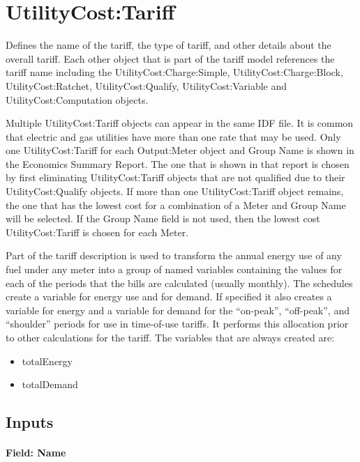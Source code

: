 \section{UtilityCost:Tariff}\label{utilitycosttariff}

Defines the name of the tariff, the type of tariff, and other details about the overall tariff. Each other object that is part of the tariff model references the tariff name including the UtilityCost:Charge:Simple, UtilityCost:Charge:Block, UtilityCost:Ratchet, UtilityCost:Qualify, UtilityCost:Variable and UtilityCost:Computation objects.

Multiple UtilityCost:Tariff objects can appear in the same IDF file. It is common that electric and gas utilities have more than one rate that may be used. Only one UtilityCost:Tariff for each Output:Meter object and Group Name is shown in the Economics Summary Report. The one that is shown in that report is chosen by first eliminating UtilityCost:Tariff objects that are not qualified due to their UtilityCost:Qualify objects. If more than one UtilityCost:Tariff object remains, the one that has the lowest cost for a combination of a Meter and Group Name will be selected. If the Group Name field is not used, then the lowest cost UtilityCost:Tariff is chosen for each Meter.

Part of the tariff description is used to transform the annual energy use of any fuel under any meter into a group of named variables containing the values for each of the periods that the bills are calculated (usually monthly). The schedules create a variable for energy use and for demand. If specified it also creates a variable for energy and a variable for demand for the ``on-peak'', ``off-peak'', and ``shoulder'' periods for use in time-of-use tariffs. It performs this allocation prior to other calculations for the tariff. The variables that are always created are:

\begin{itemize}
\item
  totalEnergy
\item
  totalDemand
\end{itemize}

\subsection{Inputs}\label{inputs-072}

\paragraph{Field: Name}\label{field-name-064}


